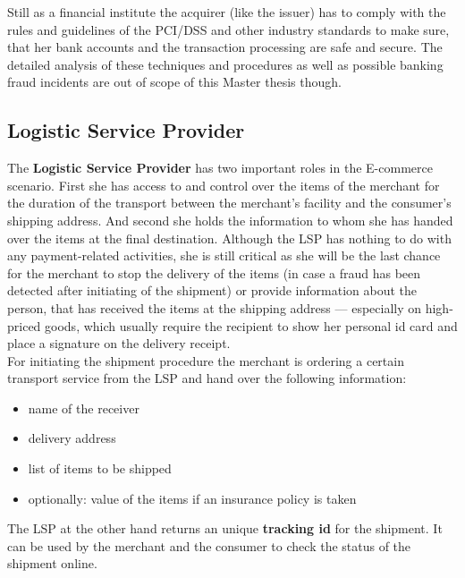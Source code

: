 Still as a financial institute the acquirer (like the issuer) has to comply with the rules and guidelines of the PCI/DSS and other industry standards to make sure, that her bank accounts and the transaction processing are safe and secure. The detailed analysis of these techniques and procedures as well as possible banking fraud incidents are out of scope of this Master thesis though.


\subsection{Logistic Service Provider}
\label{subsec:stakeholder_lsp}

The \textbf{Logistic Service Provider} has two important roles in the E-commerce scenario. First she has access to and control over the items of the merchant for the duration of the transport between the merchant's facility and the consumer's shipping address. And second she holds the information to whom she has handed over the items at the final destination. Although the \gls{LSP} has nothing to do with any payment-related activities, she is still critical as she will be the last chance for the merchant to stop the delivery of the items (in case a fraud has been detected after initiating of the shipment) or provide information about the person, that has received the items at the shipping address --- especially on high-priced goods, which usually require the recipient to show her personal id card and place a signature on the delivery receipt. \\

For initiating the shipment procedure the merchant is ordering a certain transport service from the \gls{LSP} and hand over the following information:\@

\begin{itemize}
	\item name of the receiver
	\item delivery address
	\item list of items to be shipped
	\item optionally: value of the items if an insurance policy is taken
\end{itemize}

The \gls{LSP} at the other hand returns an unique \textbf{tracking id} for the shipment. It can be used by the merchant and the consumer to check the status of the shipment online. \\

